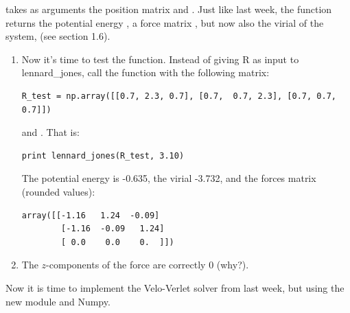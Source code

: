 \documentclass{article}
\begin{document}
 takes as arguments the position matrix  and .
Just like last week, the  function returns the potential energy ,
a force matrix , but now also the virial of the system,  (see section 1.6).\\


\begin{enumerate}[resume]

    \item Now it's time to test the  function.
        Instead of giving R as input to lennard\_jones, call the function with the following  matrix:

\begin{lstlisting}
R_test = np.array([[0.7, 2.3, 0.7], [0.7,  0.7, 2.3], [0.7, 0.7, 0.7]])
\end{lstlisting}

    and . That is:

\begin{lstlisting}
print lennard_jones(R_test, 3.10)
\end{lstlisting}

    The potential energy is -0.635, the virial -3.732,
    and the forces matrix (rounded values):

\begin{lstlisting}
array([[-1.16   1.24  -0.09]
        [-1.16  -0.09   1.24]
        [ 0.0    0.0    0.  ]])
\end{lstlisting}

    \item
    The $z$-components of the force are correctly 0 (why?).

\end{enumerate}

Now it is time to implement the Velo-Verlet solver from last week, but using the new module and Numpy.
\end{document}
